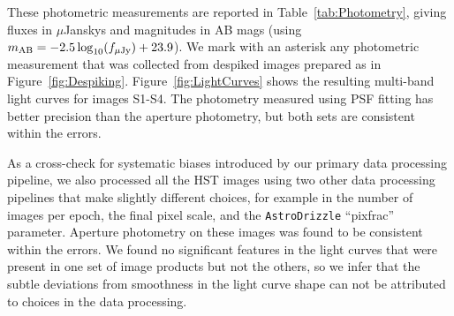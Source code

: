 These photometric measurements are reported in Table~\ref{tab:Photometry}, giving fluxes in $\mu$Janskys and magnitudes in AB mags (using $m_{\rm AB}=-2.5\log_{10}(f_{\mu\rm{Jy}})+23.9$).  We mark with an asterisk any photometric measurement that was collected from despiked images prepared as in Figure~\ref{fig:Despiking}. Figure~\ref{fig:LightCurves} shows the resulting multi-band light curves for images S1-S4. The photometry measured using PSF fitting has better precision than the aperture photometry, but both sets are consistent within the errors.   

As a cross-check for systematic biases introduced by our primary data processing pipeline, we also processed all the HST images using two other data processing pipelines that make slightly different choices, for example in the number of images per epoch, the final pixel scale, and the {\tt AstroDrizzle} ``pixfrac'' parameter.  Aperture photometry on these images was found to be consistent within the errors. We found no significant features in the light curves that were present in one set of image products but not the others, so we infer that the subtle deviations from smoothness in the light curve shape can not be attributed to choices in the data processing. 

